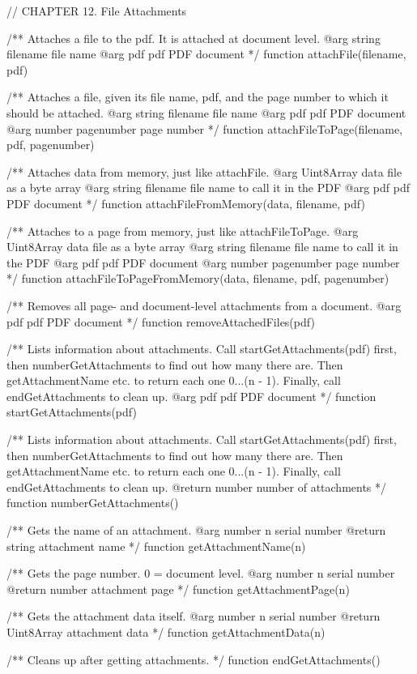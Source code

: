 // CHAPTER 12. File Attachments
    
/** Attaches a file to the pdf. It is attached at document level.
@arg {string} filename file name
@arg {pdf} pdf PDF document */
function attachFile(filename, pdf) {}

/** Attaches a file, given its file name, pdf, and the page number
to which it should be attached.
@arg {string} filename file name
@arg {pdf} pdf PDF document
@arg {number} pagenumber page number */
function attachFileToPage(filename, pdf, pagenumber) {}

/** Attaches data from memory, just like attachFile.
@arg {Uint8Array} data file as a byte array
@arg {string} filename file name to call it in the PDF
@arg {pdf} pdf PDF document */
function attachFileFromMemory(data, filename, pdf) {}

/** Attaches to a page from memory, just like attachFileToPage.
@arg {Uint8Array} data file as a byte array
@arg {string} filename file name to call it in the PDF
@arg {pdf} pdf PDF document
@arg {number} pagenumber page number */
function attachFileToPageFromMemory(data, filename, pdf, pagenumber) {}

/** Removes all page- and document-level attachments from a document.
@arg {pdf} pdf PDF document */
function removeAttachedFiles(pdf) {}

/** Lists information about attachments. Call startGetAttachments(pdf) first,
then numberGetAttachments to find out how many there are. Then
getAttachmentName etc. to return each one 0...(n - 1). Finally, call
endGetAttachments to clean up.
@arg {pdf} pdf PDF document */
function startGetAttachments(pdf) {}

/** Lists information about attachments. Call startGetAttachments(pdf) first,
then numberGetAttachments to find out how many there are. Then
getAttachmentName etc. to return each one 0...(n - 1). Finally, call
endGetAttachments to clean up.
@return {number} number of attachments */
function numberGetAttachments() {}

/** Gets the name of an attachment.
@arg {number} n serial number
@return {string} attachment name */
function getAttachmentName(n) {}

/** Gets the page number. 0 = document level.
@arg {number} n serial number
@return {number} attachment page */
function getAttachmentPage(n) {}

/** Gets the attachment data itself.
@arg {number} n serial number
@return {Uint8Array} attachment data */
function getAttachmentData(n) {}

/** Cleans up after getting attachments. */
function endGetAttachments() {}

